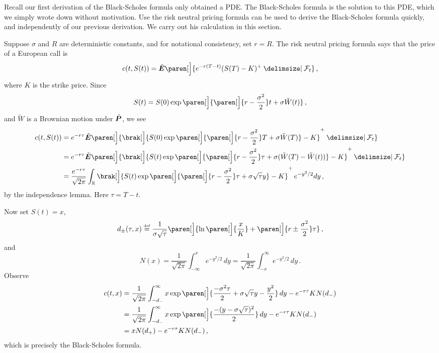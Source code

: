 Recall our first derivation of the Black-Scholes formula only obtained a PDE.
The Black-Scholes formula is the solution to this PDE, which we simply wrote down without motivation.
Use the risk neutral pricing formula can be used to derive the Black-Scholes formula quickly, and independently of our previous derivation.
We carry out his calculation in this section.


Suppose $\sigma$ and $R$ are deterministic constants, and for notational consistency, set $r = R$.
The risk neutral pricing formula says that the price of a European call is
\begin{equation*}
  c(t, S(t)) = \tilde\E\paren[\Big]{
    e^{-r(T-t)}	(S(T) - K)^+ \given \mathcal F_t
  }\,,
\end{equation*}
where $K$ is the strike price.
Since
\begin{equation*}
  S(t) = S(0) \exp\paren[\Big]{ \paren[\Big]{ r - \frac{\sigma^2}{2}} t + \sigma \tilde W(t) }\,,
\end{equation*}
and $\tilde W$ is a Brownian motion under $\tilde\P$, we see
\begin{align*}
  c(t, S(t))
    &= e^{-r\tau} \tilde\E\paren[\Big]{\brak[\Big]{
	S(0) \exp\paren[\Big]{ \paren[\Big]{ r - \frac{\sigma^2}{2} } T + \sigma \tilde W(T)} -K }^+
      \given \mathcal F_t }
  \\
    &= e^{-r\tau} \tilde\E\paren[\Big]{
      \brak[\Big]{S(t) \exp\paren[\Big]{ \paren[\Big]{r - \frac{\sigma^2}{2}} \tau + \sigma (\tilde W(T) - \tilde W(t))} - K }^+ \given \mathcal F_t }
  \\
    &= \frac{e^{-r \tau}}{\sqrt{2\pi}}
	\int_\R 
	  \brak[\Big]{S(t) \exp\paren[\Big]{ \paren[\Big]{r - \frac{\sigma^2}{2}} \tau + \sigma \sqrt{\tau} y} - K }^+ \, e^{-y^2 / 2} dy\,,
\end{align*}
by the independence lemma.
Here $\tau = T - t$.

Now set $S(t) = x$,
\begin{equation*}
  d_\pm( \tau, x ) \defeq
  \frac{1}{\sigma \sqrt{\tau}}\paren[\Big]{
    \ln\paren[\Big]{\frac{x}{K}}
    + \paren[\Big]{ r \pm \frac{\sigma^2}{2} } \tau
  }\,,
\end{equation*}
and
\begin{equation*}
  N(x)
    = \frac{1}{\sqrt{2\pi}} \int_{-\infty}^x e^{-y^2/2} \, dy
    = \frac{1}{\sqrt{2\pi}} \int_{-x}^\infty e^{-y^2/2} \, dy\,.
\end{equation*}
Observe
\begin{align*}
  c(t, x)
    &= \frac{1}{\sqrt{2\pi}} \int_{-d_-}^\infty 
	x \exp\paren[\Big]{ \frac{-\sigma^2 \tau}{2} + \sigma\sqrt{\tau} y - \frac{y^2}{2} } \, dy
	- e^{-r\tau} K N(d_-)
  \\
    &= \frac{1}{\sqrt{2\pi}} \int_{-d_-}^\infty 
	x \exp\paren[\Big]{ \frac{-(y - \sigma \sqrt{\tau})^2}{2}} \, dy
	- e^{-r\tau} K N(d_-)
  \\
    &= x N(d_+) 
	- e^{-r\tau} K N(d_-)\,,
\end{align*}
which is precisely the Black-Scholes formula.

